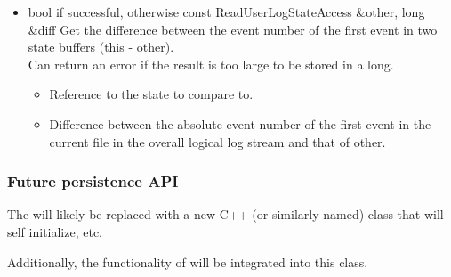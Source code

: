 \begin{itemize}
\begin{itemize}
\item {}
  {bool} { if successful,  otherwise}
  {const ReadUserLogStateAccess \&other, long \&diff}
  {Get the difference between the event number of the first event in
    two state buffers (this - other).
    \\ \Note Can return an error if the result is too large
    to be stored in a long.}
  \begin{itemize}
  \item {}
    Reference to the state to compare to.
  \item {}
    Difference between the absolute event number of the first event in
    the current file in the overall logical log stream and that of
    other.
  \end{itemize}

\end{itemize}	%

\end{itemize}

\subsubsection{Future persistence API}
The  will likely be replaced with a new
C++  (or similarly named) class that
will self initialize, etc.

Additionally, the functionality of  will
be integrated into this class.